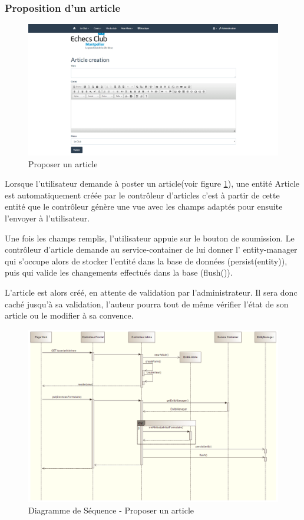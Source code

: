 \documentclass[a4paper,12pt, notitlepage]{report}
\begin{document}
\subsubsection{Proposition d'un article}
\begin{figure}
    \caption{Proposer un article}  
    \label{proposer-article}
    \centering
    \includegraphics[scale=0.3]{images/proposer-article.png}
\end{figure}
Lorsque l’utilisateur demande à poster un article(voir figure \ref{proposer-article}), une entité Article est automatiquement créée par le contrôleur d’articles c’est à partir de cette entité que le contrôleur génère une vue avec les champs adaptés pour ensuite l’envoyer à l’utilisateur.


Une fois les champs remplis, l’utilisateur appuie sur le bouton de soumission. Le contrôleur d’article demande au \gls{service-container} de lui donner l’ \gls{entity-manager} qui s’occupe alors de stocker l’entité dans la base de données (persist(entity)), puis qui valide les changements effectués dans la base (flush()).

L’article est alors créé, en attente de validation par l’administrateur. Il sera donc caché jusqu’à sa validation, l’auteur pourra tout de même vérifier l’état de son article ou le modifier à sa convence.
\begin{figure} 
    \caption{Diagramme de Séquence - Proposer un article}  
    \label{seq-proposer-article}
    \centering
    \includegraphics[scale=0.37]{images/DiaSequenceProposerArticle.png}
\end{figure}
\end{document}

